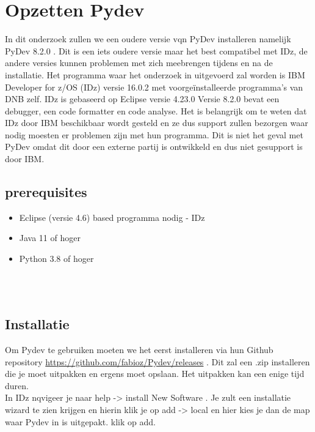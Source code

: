 
\chapter{Opzetten Pydev}
\label{ch:opzetten-pydev}

In dit onderzoek zullen we een oudere versie vqn PyDev installeren namelijk PyDev 8.2.0 . Dit is een iets oudere versie maar het best compatibel met IDz, de andere versies kunnen problemen met zich meebrengen tijdens en na de installatie. Het programma waar het onderzoek in uitgevoerd zal worden is IBM Developer for z/OS (IDz) versie 16.0.2 met voorgeïnstalleerde programma's van DNB zelf. IDz is gebaseerd op Eclipse versie 4.23.0
Versie 8.2.0 bevat een debugger, een code formatter en code analyse. Het is belangrijk om te weten dat IDz door IBM beschikbaar wordt gesteld en ze dus support zullen bezorgen waar nodig moesten er problemen zijn met hun programma. Dit is niet het geval met PyDev omdat dit door een externe partij is ontwikkeld en dus niet gesupport is door IBM. \\

\section{prerequisites}
\begin{itemize}
    \item Eclipse (versie 4.6) based programma nodig - IDz
    \item Java 11 of hoger
    \item Python 3.8 of hoger
\end{itemize}

\\
\\
\section{Installatie}
Om Pydev te gebruiken moeten we het eerst installeren via hun Github repository \url{https://github.com/fabioz/Pydev/releases} . Dit zal een .zip installeren die je moet uitpakken en ergens moet opslaan. Het uitpakken kan een enige tijd duren. \\

In IDz nqvigeer je naar help -> install New Software . Je zult een installatie wizard te zien krijgen en hierin klik je op add -> local en hier kies je dan de map waar Pydev in is uitgepakt. klik op add.

